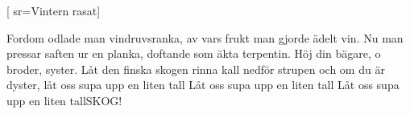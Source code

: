 [ 		
	sr={Vintern rasat}]		
	
\beginverse*						
Fordom odlade man vindruvsranka,
av vars frukt man gjorde ädelt vin.
Nu man pressar saften ur en planka,
doftande som äkta terpentin.
Höj din bägare, o broder, syster.
Låt den finska skogen rinna kall
nedför strupen och om du är dyster,
låt oss supa upp en liten tall
Låt oss supa upp en liten tall
Låt oss supa upp en liten tallSKOG!
\endverse										
\endsong		
